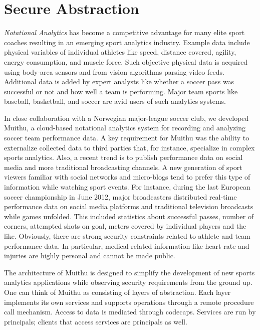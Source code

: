 \documentclass[10pt, conference, compsocconf]{IEEEtran}
\begin{document}
\section{Secure Abstraction}

\emph{Notational Analytics} has become a competitive advantage for
many elite sport coaches resulting in an emerging sport analytics
industry.  Example data include physical variables of individual
athletes like speed, distance covered, agility, energy consumption,
and muscle force.  Such objective physical data is acquired using
body-area sensors and from vision algorithms parsing video feeds.
Additional data is added by expert analysts like whether a soccer pass
was successful or not and how well a team is performing.  Major team
sports like baseball, basketball, and soccer are avid users of such
analytics systems. 

In close collaboration with a Norwegian major-league soccer club,
we developed Muithu, a cloud-based notational analytics system for
recording and analyzing soccer team performance data.  A key requirement
for Muithu was the ability to externalize collected data to third
parties that, for instance, specialize in complex sports analytics.
Also, a recent trend is to publish performance data on social media
and more traditional broadcasting channels.  A new generation of sport
viewers familiar with social networks and micro-blogs tend to prefer this
type of information while watching sport events.  For instance, during
the last European soccer championship in June 2012, major broadcasters
distributed real-time performance data on social media platforms and
traditional television broadcasts while games unfolded.  This included
statistics about successful passes, number of corners, attempted shots
on goal, meters covered by individual players and the like.
Obviously, there are strong security constraints related to athlete and
team performance data.  In particular, medical related information like
heart-rate and injuries are highly personal and cannot be
made public.

The architecture of Muithu is designed to simplify the development of
new sports analytics applications while observing security requirements
from the ground up.  One can think of Muithu as consisting of layers
of abstraction.  Each layer implements its own services and supports
operations through a remote procedure call mechanism.  Access to data
is mediated through codecaps.  Services are run by principals; clients
that access services are principals as well.
\end{document}
